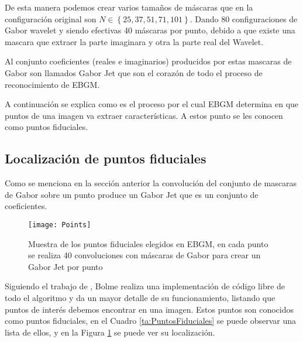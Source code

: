 De esta manera podemos crear varios tamaños de máscaras que en la configuración original son $N \in \left\{25, 37, 51, 71, 101 \right\}$. Dando 80 configuraciones de Gabor wavelet y siendo efectivas 40 máscaras por punto, debido a que existe una mascara que extraer la parte imaginara y otra la parte real del Wavelet.

Al conjunto coeficientes (reales e imaginarios) producidos por estas mascaras de Gabor son llamados Gabor Jet que son el corazón de todo el proceso de reconocimiento de \ac{EBGM}.

A continuación se explica como es el proceso por el cual \ac{EBGM} determina en que puntos de una imagen va extraer características. A estos punto se les conocen como puntos fiduciales.

\subsection{Localización de puntos fiduciales}
Como se menciona en la sección anterior la convolución del conjunto de mascaras de Gabor sobre un punto produce un Gabor Jet que es un conjunto de coeficientes.

\begin{figure}[h]
\center
\texttt{[image: Points]}
\caption{Muestra de los puntos fiduciales elegidos en \ac{EBGM}\cite{bolme2003elastic}, en cada punto se realiza 40 convoluciones con máscaras de Gabor para crear un Gabor Jet por punto}
\label{im:puntos}
\end{figure}

Siguiendo el trabajo de \cite{wiskott1997face}, Bolme realiza una implementación de código libre de todo el algoritmo y da un mayor detalle de su funcionamiento, listando que puntos de interés debemos encontrar en una imagen. Estos puntos son conocidos como puntos fiduciales, en el Cuadro \ref{ta:PuntosFiduciales} se puede observar una lista de ellos, y en la Figura \ref{im:puntos} se puede ver su localización.

